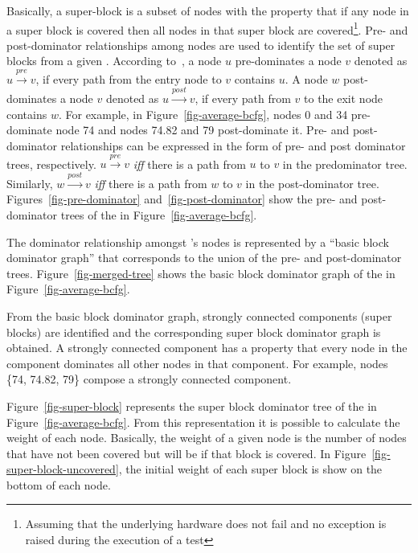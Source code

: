 Basically, a super-block is a subset of nodes with the property
that if any node in a super block is covered then all nodes in
that super block are covered\footnote{Assuming that the
    underlying hardware does not fail and no exception
    is raised during the execution of a test}. Pre- and
post-dominator relationships among nodes are used to identify the
set of super blocks from a given \BG. According
to~\cite{Agrawal94DSBP}, a node $u$ pre-dominates a node $v$
denoted as $u \stackrel{pre}{\rightarrow} v$, if every path from
the entry node to $v$ contains $u$. A node $w$ post-dominates a
node $v$ denoted as $u \stackrel{post}{\rightarrow} v$, if every
path from $v$ to the exit node contains $w$. For example, in
Figure~\ref{fig-average-bcfg}, nodes 0 and 34 pre-dominate node 74
and nodes 74.82 and 79 post-dominate it. Pre- and post-dominator
relationships can be expressed in the form of pre- and post
dominator trees, respectively. $u \stackrel{pre}{\rightarrow} v$
\emph{iff} there is a path from $u$ to $v$ in the predominator
tree. Similarly, $w \stackrel{post}{\rightarrow} v$ \emph{iff}
there is a path from $w$ to $v$ in the post-dominator tree.
Figures~\ref{fig-pre-dominator} and~\ref{fig-post-dominator} show
the pre- and post-dominator trees of the \BG in
Figure~\ref{fig-average-bcfg}.

The dominator relationship amongst \BG's nodes is represented by a
``basic block dominator graph'' that corresponds to the union of
the pre- and post-dominator trees. Figure~\ref{fig-merged-tree}
shows the basic block dominator graph of the \BG in
Figure~\ref{fig-average-bcfg}.

From the basic block dominator graph, strongly connected
components (super blocks) are identified and the corresponding
super block dominator graph is obtained. A strongly connected
component has a property that every node in the component
dominates all other nodes in that component. For example, nodes
\{74, 74.82, 79\} compose a strongly connected component.

Figure~\ref{fig-super-block} represents the super block dominator
tree of the \BG in Figure~\ref{fig-average-bcfg}. From this
representation it is possible to calculate the weight of each \BG
node. Basically, the weight of a given node is the number of nodes
that have not been covered but will be if that block is covered.
In Figure~\ref{fig-super-block-uncovered}, the initial weight of
each super block is show on the bottom of each node.

